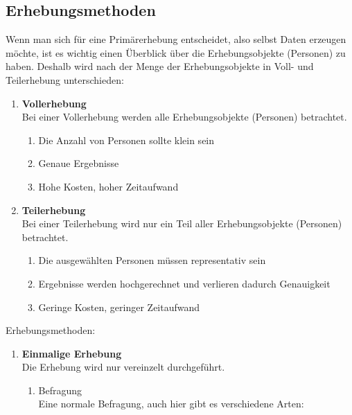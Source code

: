 \subsection{Erhebungsmethoden}
\begin{flushleft}
    Wenn man sich für eine Primärerhebung entscheidet, also selbst Daten erzeugen möchte, ist es wichtig einen Überblick über die Erhebungsobjekte (Personen) zu haben.
    Deshalb wird nach der Menge der Erhebungsobjekte in Voll- und Teilerhebung unterschieden:
    \begin{enumerate}
        \item {
            \textbf{Vollerhebung} \\
            Bei einer Vollerhebung werden alle Erhebungsobjekte (Personen) betrachtet.
            \begin{enumerate}
                \item Die Anzahl von Personen sollte klein sein
                \item Genaue Ergebnisse
                \item Hohe Kosten, hoher Zeitaufwand
            \end{enumerate}
        }
        \item {
            \textbf{Teilerhebung} \\
            Bei einer Teilerhebung wird nur ein Teil aller Erhebungsobjekte (Personen) betrachtet.
            \begin{enumerate}
                \item Die ausgewählten Personen müssen representativ sein
                \item Ergebnisse werden hochgerechnet und verlieren dadurch Genauigkeit
                \item Geringe Kosten, geringer Zeitaufwand
            \end{enumerate}    
        }
    \end{enumerate}
    Erhebungsmethoden:
    \begin{enumerate}
        \item {
            \textbf{Einmalige Erhebung} \\
            Die Erhebung wird nur vereinzelt durchgeführt.
            \begin{enumerate}
                \item {
                    Befragung \\
                    Eine normale Befragung, auch hier gibt es verschiedene Arten:
                    \begin{enumerate}

\end{enumerate}}
\end{enumerate}}
\end{enumerate}
\end{flushleft}
